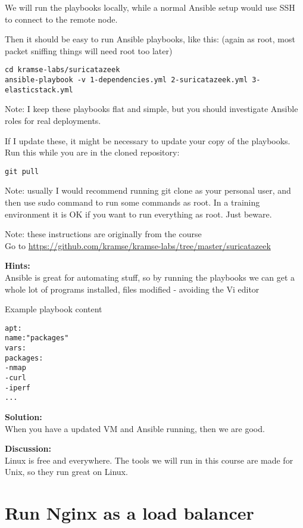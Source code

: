\documentclass[a4paper,11pt,notitlepage]{report}
\begin{document}
We will run the playbooks locally, while a normal Ansible setup would use SSH to connect to the remote node.

Then it should be easy to run Ansible playbooks, like this: (again as root, most packet sniffing things will need root too later)

\begin{verbatim}
cd kramse-labs/suricatazeek
ansible-playbook -v 1-dependencies.yml 2-suricatazeek.yml 3-elasticstack.yml
\end{verbatim}

Note: I keep these playbooks flat and simple, but you should investigate Ansible roles for real deployments.

If I update these, it might be necessary to update your copy of the playbooks. Run this while you are in the cloned repository:

\begin{verbatim}
git pull
\end{verbatim}

Note: usually I would recommend running git clone as your personal user, and then use sudo command to run some commands as root. In a training environment it is OK if you want to run everything as root. Just beware.

Note: these instructions are originally from the course\\
Go to \url{https://github.com/kramse/kramse-labs/tree/master/suricatazeek}

{\bf Hints:}\\
Ansible is great for automating stuff, so by running the playbooks we can get a whole lot of programs installed, files modified - avoiding the Vi editor \smiley

Example playbook content
\begin{alltt}
apt:
      name: "{{ packages }}"
    vars:
      packages:
        - nmap
        - curl
        - iperf
        ...
\end{alltt}

{\bf Solution:}\\
When you have a updated VM and Ansible running, then we are good.

{\bf Discussion:}\\
Linux is free and everywhere. The tools we will run in this course are made for Unix, so they run great on Linux.


\chapter{Run Nginx as a load balancer}
\label{ex:nginx-loadbalancer}
\end{document}
